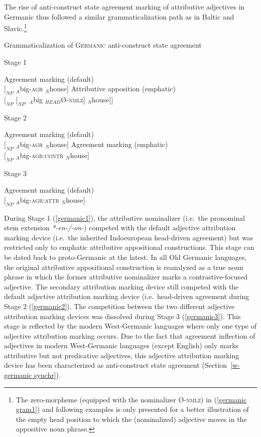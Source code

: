 {The rise of anti-construct state agreement marking of attributive adjectives in Germanic thus followed a similar grammaticalization path as in Baltic and Slavic.\footnote{The zero-morpheme (equipped with the nominalizer Ø-\textsc{nmlz}) in (\ref{germanic gram1}) and following examples is only presented for a better illustration of the empty head position to which the (nominalized) adjective moves in the appositive noun phrase.}
\begin{exe}
\ex Grammaticalization of \textsc{Germanic} anti-construct state agreement \label{germanic gram1}
\begin{xlist}
\ex	Stage 1 \label{germanic1}
\begin{xlist}
\ex	Agreement marking (default)\\
$[_{NP}$ $_{A}$big-\textsc{agr} $_{N}$house$]$
\ex Attributive apposition (emphatic)\\
$[_{NP}$ $[_{NP'}$ $_{A}$big $_{HEAD}$Ø-\textsc{nmlz}$]$ $_{N}$house$] ]$\label{germanic art1}
\end{xlist}
\ex 	Stage 2 \label{germanic2}
\begin{xlist}
\ex	Agreement marking (default) \\
$[_{NP}$ $_{A}$big-\textsc{agr} $_{N}$house$]$
\ex	Agreement marking (emphatic) \\
$[_{NP}$ $_{A}$big-\textsc{agr:contr} $_{N}$house$]$\label{germanic ACAgr}
\end{xlist}
\ex 	Stage 3 \label{germanic3}
\begin{xlist}
\ex 	Agreement marking (default)\\
$[_{NP}$ $_{A}$big-\textsc{agr:attr} $_{N}$house$]$
\end{xlist}
\end{xlist}
\end{exe}
During Stage 1 (\ref{germanic1}), the attributive nominalizer (i.e.~the pronominal stem extension \textit{*-en-/-on-}) competed with the default adjective attribution marking device (i.e.~the inherited Indoeuropean head-driven agreement) but was restricted only to emphatic attributive appositional constructions. This stage can be dated back to proto-Germanic at the latest. In all Old Germanic languages, the original attributive appositional construction is reanalyzed as a true noun phrase in which the former attributive nominalizer marks a contrastive-focused adjective. The secondary attribution marking device still competed with the default adjective attribution marking device (i.e.~head-driven agreement during Stage 2 (\ref{germanic2}). The competition between the two different adjective attribution marking devices was dissolved during Stage 3 (\ref{germanic3}). This stage is reflected by the modern West-Germanic languages where only one type of adjective attribution marking occurs. Due to the fact that agreement inflection of adjectives in modern West-Germanic languages (except English) only marks attributive but not predicative adjectives, this adjective attribution marking device has been characterized as anti-construct state agreement (Section~\ref{w-germanic synchr}).

}
